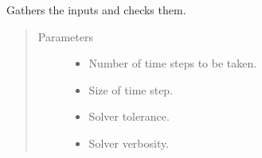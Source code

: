 \documentclass[letterpaper,10pt,english]{sphinxmanual}
\begin{document}
\begin{fulllineitems}
\begin{fulllineitems}
\label{\detokenize{cmf:livestock.components.comp_cmf.CMFSolverSettings.run_checks}}
Gathers the inputs and checks them.
\begin{quote}\begin{description}
\item[{Parameters}] \leavevmode\begin{itemize}
\item {} 
 \textendash{} Number of time steps to be taken.

\item {} 
 \textendash{} Size of time step.

\item {} 
 \textendash{} Solver tolerance.

\item {} 
 \textendash{} Solver verbosity.

\end{itemize}

\end{description}\end{quote}

\end{fulllineitems}


\end{fulllineitems}

\end{document}
